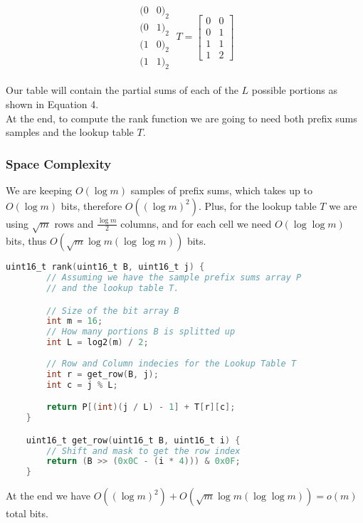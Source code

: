 \documentclass{article}
\begin{document}
\begin{align}
     \begin{matrix}
         (0 & 0)_2 \\
         (0 & 1)_2 \\
         (1 & 0)_2 \\
         (1 & 1)_2 
     \end{matrix} \;
     T = 
     \begin{bmatrix}
        0 & 0 \\
        0 & 1 \\
        1 & 1 \\
        1 & 2
    \end{bmatrix} 
\end{align}

\noindent Our table will contain the partial sums of each of the $L$ possible portions as 
shown in Equation 4.\\

\noindent At the end, to compute the rank function we are going to need
both prefix sums samples and the lookup table $T$.

\subsubsection{Space Complexity}

We are keeping $O(\log m)$ samples of prefix sums, which takes up to $O(\log m)$ bits,
therefore $O((\log{m})^2)$.
Plus, for the lookup table $T$ we are using $\sqrt m$ rows and $\frac{\log m}{2}$ columns, and for each cell we
need $O(\log \log m)$ bits, thus $O(\sqrt{m}\log m (\log \log m))$ bits.

\begin{lstlisting}[language=C,caption=`Rank function implemented using a bit array of 16 elements.']
    uint16_t rank(uint16_t B, uint16_t j) {
        // Assuming we have the sample prefix sums array P
        // and the lookup table T.

        // Size of the bit array B
        int m = 16; 
        // How many portions B is splitted up
        int L = log2(m) / 2;
        
        // Row and Column indecies for the Lookup Table T
        int r = get_row(B, j);
        int c = j % L;

        return P[(int)(j / L) - 1] + T[r][c];
    }

    uint16_t get_row(uint16_t B, uint16_t i) {
        // Shift and mask to get the row index
        return (B >> (0x0C - (i * 4))) & 0x0F;
    }
\end{lstlisting}

\noindent At the end we have $O((\log m)^2) + O(\sqrt{m}\log m (\log \log m)) = o(m)$ total bits.
\end{document}
